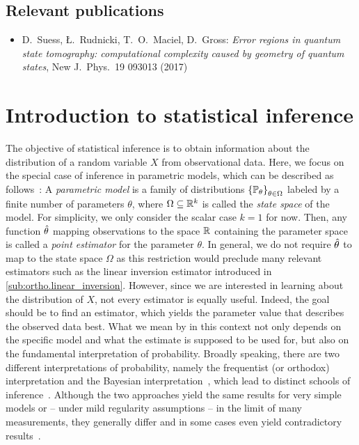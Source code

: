 \subsection*{Relevant publications}
\begin{itemize}
  \item D.\ Suess, Ł.\ Rudnicki, T.\ O.\ Maciel, D.\ Gross: \textit{Error regions in quantum state tomography: computational complexity caused by geometry of quantum states}, New J.\ Phys.\ 19 093013 (2017)
\end{itemize}

\section{Introduction to statistical inference}%
\label{sec:error.stat}

The objective of statistical inference is to obtain information about the distribution of a random variable $X$ from observational data.
Here, we focus on the special case of inference in parametric models, which can be described as follows~\cite{Wasserman_2013_All}:
A \emph{parametric model} is a family of distributions ${\{\mathbb{P}_\theta\}}_{\theta \in \Omega}$ labeled by a finite number of parameters $\theta$, where $\Omega \subseteq {\mathbb{R}}^k$ is called the \emph{state space} of the model.
For simplicity, we only consider the scalar case $k=1$ for now.
Then, any function $\hat{\theta}$ mapping observations to the space ${\mathbb{R}}$ containing the parameter space is called a \emph{point estimator} for the parameter $\theta$.
In general, we do not require $\hat{\theta}$ to map to the state space $\Omega$ as this restriction would preclude many relevant estimators such as the linear inversion estimator introduced in \cref{sub:ortho.linear_inversion}.
However, since we are interested in learning about the distribution of $X$, not every estimator is equally useful.
Indeed, the goal should be to find an estimator, which yields the parameter value that describes the observed data best.
What we mean by  in this context not only depends on the specific model and what the estimate is supposed to be used for, but also on the fundamental interpretation of probability.
Broadly speaking, there are two different interpretations of probability, namely the frequentist (or orthodox) interpretation and the Bayesian interpretation~\cite{Hajek_2012_Interpretations,Caves_2000_Probabilities}, which lead to distinct schools of inference~\cite{Kiefer_2012_Introduction,Bolstad_2007_Introduction,Wasserman_2013_All}.
Although the two approaches yield the same results for very simple models or -- under mild regularity assumptions -- in the limit of many measurements, they generally differ and in some cases even yield contradictory results~\cite[Sec. 11.9]{Wasserman_2013_All}.

